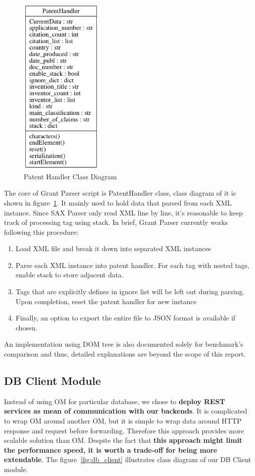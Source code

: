 \documentclass{article}
\begin{document}
\begin{figure}[H]
\centering
\includegraphics[width=40mm,scale=10]{handler.png}
\caption{Patent Handler Class Diagram} \label{fig:handler}
\end{figure}

The core of Grant Parser script is PatentHandler class, class diagram of it is shown in figure~\ref{fig:handler}. It mainly used to hold data that parsed from each XML instance. Since SAX Parser only read XML line by line, it's reasonable to keep track of processing tag using stack. In brief, Grant Parser currently works following this procedure:
\begin{enumerate}
 \item Load XML file and break it down into separated XML instances
 \item Parse each XML instance into patent handler. For each tag with nested tags, enable stack to store adjacent data.
 \item Tags that are explicitly defines in ignore list will be left out during parsing. Upon completion, reset the patent handler for new instance
 \item Finally, an option to export the entire file to JSON format is available if chosen.
\end{enumerate}

An implementation using DOM tree is also documented solely for benchmark's comparison and thus, detailed explanations are beyond the scope of this report.

\subsection{DB Client Module}
Instead of using OM for particular database, we chose to \textbf{deploy REST services as mean of communication with our backends}. It is complicated to wrap OM around another OM, but it is simple to wrap data around HTTP response and request before forwarding. Therefore this approach provides more scalable solution than OM. Despite the fact that \textbf{this approach might limit the performance speed, it is worth a trade-off for being more extendable}. The figure~\ref{fig:db_client} illustrates class diagram of our DB Client module.
\end{document}
